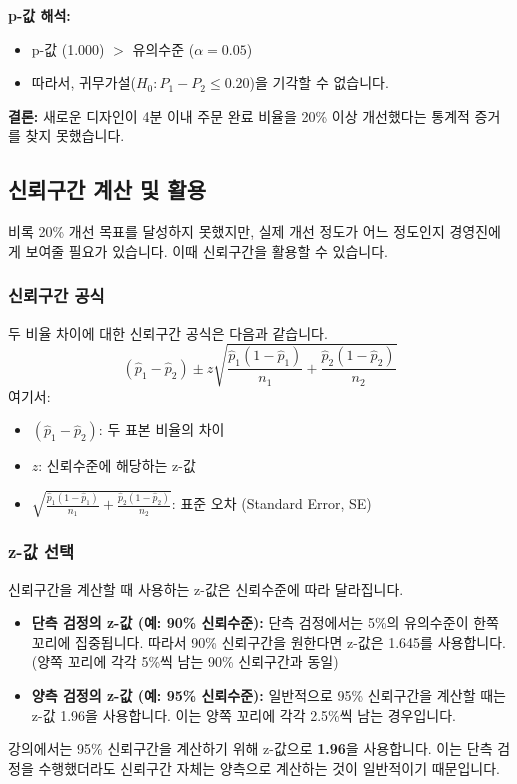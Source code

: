 \documentclass[11pt,a4paper]{article}
\begin{document}
\begin{summarybox}
\textbf{p-값 해석:}
\begin{itemize}
    \item p-값 (1.000) $>$ 유의수준 ($\alpha=0.05$)
    \item 따라서, 귀무가설($H_0: P_1 - P_2 \le 0.20$)을 기각할 수 없습니다.
\end{itemize}
\textbf{결론:} 새로운 디자인이 4분 이내 주문 완료 비율을 20\% 이상 개선했다는 통계적 증거를 찾지 못했습니다.
\end{summarybox}

\subsection{신뢰구간 계산 및 활용}

비록 20\% 개선 목표를 달성하지 못했지만, 실제 개선 정도가 어느 정도인지 경영진에게 보여줄 필요가 있습니다. 이때 신뢰구간을 활용할 수 있습니다.

\subsubsection{신뢰구간 공식}
두 비율 차이에 대한 신뢰구간 공식은 다음과 같습니다.
$$ (\hat{p}_1 - \hat{p}_2) \pm z \sqrt{\frac{\hat{p}_1(1-\hat{p}_1)}{n_1} + \frac{\hat{p}_2(1-\hat{p}_2)}{n_2}} $$
여기서:
\begin{itemize}
    \item $(\hat{p}_1 - \hat{p}_2)$: 두 표본 비율의 차이
    \item $z$: 신뢰수준에 해당하는 z-값
    \item $\sqrt{\frac{\hat{p}_1(1-\hat{p}_1)}{n_1} + \frac{\hat{p}_2(1-\hat{p}_2)}{n_2}}$: 표준 오차 (Standard Error, SE)
\end{itemize}

\subsubsection{z-값 선택}
신뢰구간을 계산할 때 사용하는 z-값은 신뢰수준에 따라 달라집니다.
\begin{itemize}
    \item \textbf{단측 검정의 z-값 (예: 90\% 신뢰수준):} 단측 검정에서는 5\%의 유의수준이 한쪽 꼬리에 집중됩니다. 따라서 90\% 신뢰구간을 원한다면 z-값은 1.645를 사용합니다. (양쪽 꼬리에 각각 5\%씩 남는 90\% 신뢰구간과 동일)
    \item \textbf{양측 검정의 z-값 (예: 95\% 신뢰수준):} 일반적으로 95\% 신뢰구간을 계산할 때는 z-값 1.96을 사용합니다. 이는 양쪽 꼬리에 각각 2.5\%씩 남는 경우입니다.
\end{itemize}
강의에서는 95\% 신뢰구간을 계산하기 위해 z-값으로 \textbf{1.96}을 사용합니다. 이는 단측 검정을 수행했더라도 신뢰구간 자체는 양측으로 계산하는 것이 일반적이기 때문입니다.
\end{document}
